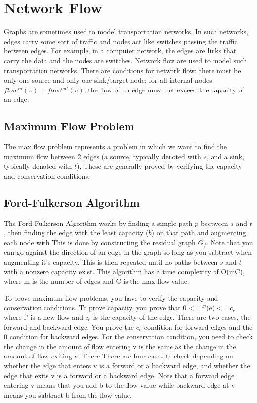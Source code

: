 \documentclass{article}
\begin{document}
\section{Network Flow}
Graphs are sometimes used to model transportation networks. In
such networks, edges carry some sort of traffic and nodes act like switches passing the
traffic between edges. For example, in a computer network, the edges are links that carry
the data and the nodes are switches. Network flow are used to model such transportation
networks. There are conditions for network flow: there must be only one source and only one sink/target node; for all internal nodes $flow^{in}(v) = flow^{out}(v)$; the flow of an edge must not exceed the capacity of an edge.

\subsection{Maximum Flow Problem}
The max flow problem represents a problem in which we want to find the maximum flow between
2 edges (a source, typically denoted with $s$, and a sink, typically denoted with $t$). These
are generally proved by verifying the capacity and conservation conditions.

\subsection{Ford-Fulkerson Algorithm}
The Ford-Fulkerson Algorithm works by finding a simple path $p$ beetween $s$ and $t$, then finding
the edge with the least capacity ($b$) on that path and augmenting each node with This is done by constructing the residual graph $G_f$.  
Note that you can go against the direction of an edge in the graph so long as you subtract when augmenting
it's capacity. This is then repeated until no paths between $s$ and $t$ with a nonzero capacity exist.
This algorithm has a time complexity of O(mC), where m is the number of edges and C is the max flow
value.


To prove maximum flow problems, you have to verify the capacity and conservation conditions. 
To prove capacity, you prove that 0 <= f'(e) <= $c_e$ where f' is a new flow and $c_e$ is the 
capacity of the edge. There are two cases, the forward and backward edge. You prove the $c_e$ 
condition for forward edges and the 0
condition for backward edges. For the conservation condition, you need to check the change in 
the amount of flow entering v is the same as the change in the amount of flow exiting v. There 
There are four cases to check depending on whether the edge that enters v is a forward or a backward 
edge, and whether the edge that exits v is a forward or a backward 
edge. Note that a forward edge entering v means that you add b to the flow value while 
backward edge at v means you subtract b from the flow value.
\end{document}
